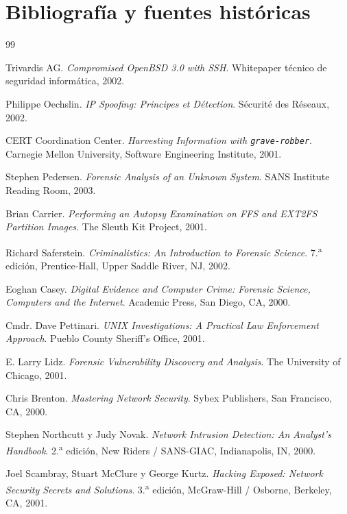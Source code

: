 \chapter*{Bibliografía y fuentes históricas}

\begin{thebibliography}{99}

Trivardis AG. \emph{Compromised OpenBSD 3.0 with SSH}. Whitepaper técnico de seguridad informática, 2002.

Philippe Oechslin. \emph{IP Spoofing: Principes et Détection}. Sécurité des Réseaux, 2002.

CERT Coordination Center. \emph{Harvesting Information with \texttt{grave-robber}}. Carnegie Mellon University, Software Engineering Institute, 2001.

Stephen Pedersen. \emph{Forensic Analysis of an Unknown System}. SANS Institute Reading Room, 2003.

Brian Carrier. \emph{Performing an Autopsy Examination on FFS and EXT2FS Partition Images}. The Sleuth Kit Project, 2001.

Richard Saferstein. \emph{Criminalistics: An Introduction to Forensic Science}. 7.\textsuperscript{a} edición, Prentice-Hall, Upper Saddle River, NJ, 2002.

Eoghan Casey. \emph{Digital Evidence and Computer Crime: Forensic Science, Computers and the Internet}. Academic Press, San Diego, CA, 2000.

Cmdr. Dave Pettinari. \emph{UNIX Investigations: A Practical Law Enforcement Approach}. Pueblo County Sheriff's Office, 2001.

E. Larry Lidz. \emph{Forensic Vulnerability Discovery and Analysis}. The University of Chicago, 2001.

Chris Brenton. \emph{Mastering Network Security}. Sybex Publishers, San Francisco, CA, 2000.

Stephen Northcutt y Judy Novak. \emph{Network Intrusion Detection: An Analyst's Handbook}. 2.\textsuperscript{a} edición, New Riders / SANS-GIAC, Indianapolis, IN, 2000.

Joel Scambray, Stuart McClure y George Kurtz. \emph{Hacking Exposed: Network Security Secrets and Solutions}. 3.\textsuperscript{a} edición, McGraw-Hill / Osborne, Berkeley, CA, 2001.

\end{thebibliography}
